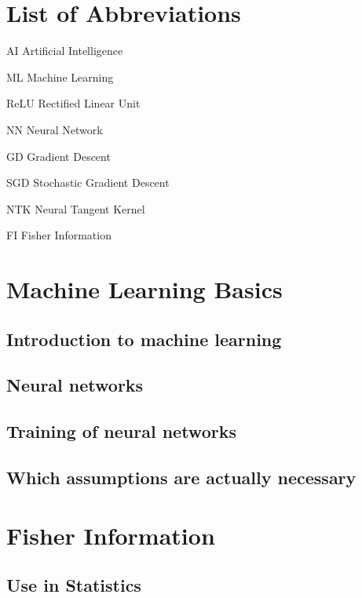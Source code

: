 \documentclass[12pt, a4paper]{report}
\begin{document}
	\chapter*{List of Abbreviations}
	\begin{abbreviations}
		\item[AI] Artificial Intelligence
		\item[ML] Machine Learning
		\item[ReLU] Rectified Linear Unit
		\item[NN] Neural Network
		\item[GD] Gradient Descent
		\item[SGD] Stochastic Gradient Descent
		\item[NTK] Neural Tangent Kernel
		\item[FI] Fisher Information
	\end{abbreviations}	
	
	\chapter{Machine Learning Basics}
	\section{Introduction to machine learning}
	
	\section{Neural networks}
	
	\section{Training of neural networks}
	
	\section{Which assumptions are actually necessary}
	
	
	
	\chapter{Fisher Information}
	\section{Use in Statistics}
	
\end{document}
